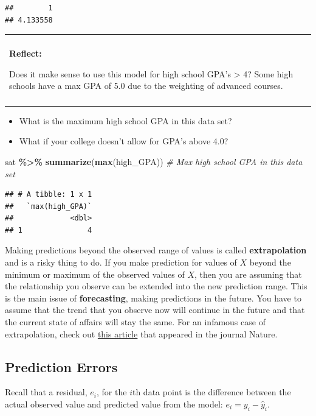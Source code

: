 \documentclass[
]{book}
\newenvironment{Shaded}{\begin{snugshade}}{\end{snugshade}}
\newcommand{\CommentTok}[1]{\textcolor[rgb]{0.56,0.35,0.01}{\textit{#1}}}
\newcommand{\FunctionTok}[1]{\textcolor[rgb]{0.13,0.29,0.53}{\textbf{#1}}}
\newcommand{\NormalTok}[1]{#1}
\newcommand{\SpecialCharTok}[1]{\textcolor[rgb]{0.81,0.36,0.00}{\textbf{#1}}}
\providecommand{\tightlist}{%
  \setlength{\itemsep}{0pt}\setlength{\parskip}{0pt}}
\newenvironment{reflect}
{
    \begin{center}
    
    \begin{tabular}{|p{0.8\textwidth}|}
    \rowcolor{LightBlue}
    \hline\\
    \rowcolor{LightBlue}
    \textbf{Reflect:}
}
{
    \\\rowcolor{LightBlue}
    \\\hline
    \end{tabular} 
    \end{center}
}
\begin{document}
\begin{verbatim}
##        1 
## 4.133558
\end{verbatim}

\begin{reflect}
Does it make sense to use this model for high school GPA's
\textgreater{} 4? Some high schools have a max GPA of 5.0 due to the
weighting of advanced courses.
\end{reflect}

\begin{itemize}
\tightlist
\item
  What is the maximum high school GPA in this data set?
\item
  What if your college doesn't allow for GPA's above 4.0?
\end{itemize}

\begin{Shaded}
\begin{Highlighting}[]
\NormalTok{sat }\SpecialCharTok{\%\textgreater{}\%}
    \FunctionTok{summarize}\NormalTok{(}\FunctionTok{max}\NormalTok{(high\_GPA)) }\CommentTok{\# Max high school GPA in this data set}
\end{Highlighting}
\end{Shaded}

\begin{verbatim}
## # A tibble: 1 x 1
##   `max(high_GPA)`
##             <dbl>
## 1               4
\end{verbatim}

Making predictions beyond the observed range of values is called \textbf{extrapolation} and is a risky thing to do. If you make prediction for values of \(X\) beyond the minimum or maximum of the observed values of \(X\), then you are assuming that the relationship you observe can be extended into the new prediction range. This is the main issue of \textbf{forecasting}, making predictions in the future. You have to assume that the trend that you observe now will continue in the future and that the current state of affairs will stay the same. For an infamous case of extrapolation, check out \href{https://www.ncbi.nlm.nih.gov/pmc/articles/PMC3173856/}{this article} that appeared in the journal Nature.

\subsection{Prediction Errors}\label{prediction-errors}

Recall that a residual, \(e_i\), for the \(i\)th data point is the difference between the actual observed value and predicted value from the model: \(e_i = y_i - \hat{y}_i\).
\end{document}

